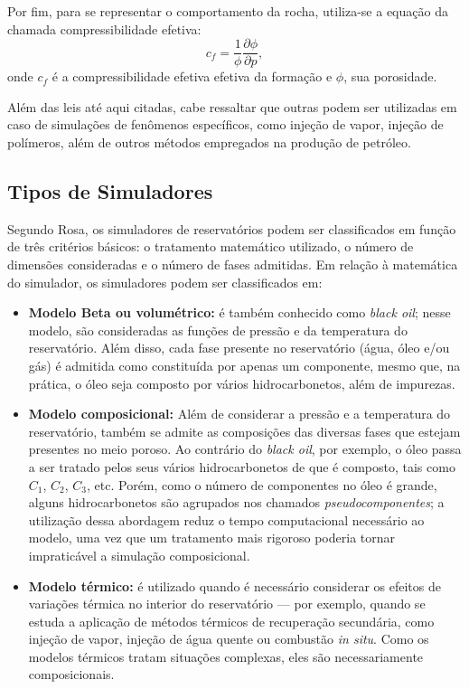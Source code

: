 Por fim, para se representar o comportamento da rocha, utiliza-se a equa\c{c}\~{a}o da chamada compressibilidade efetiva:
\begin{equation}
	c_f = \frac{1}{\phi} \frac{\partial\phi}{\partial p},
\end{equation}
onde $c_f$ \'{e} a compressibilidade efetiva efetiva da forma\c{c}\~{a}o e $\phi$, sua porosidade.

Al\'{e}m das leis at\'{e} aqui citadas, cabe ressaltar que outras podem ser utilizadas em caso de simula\c{c}\~{o}es de fen\^{o}menos espec\'{i}ficos, como inje\c{c}\~{a}o de vapor, inje\c{c}\~{a}o de pol\'{i}meros, al\'{e}m de outros m\'{e}todos empregados na produ\c{c}\~{a}o de petr\'{o}leo.

\subsection{Tipos de Simuladores}
Segundo Rosa, os simuladores de reservat\'{o}rios podem ser classificados em fun\c{c}\~{a}o de tr\^{e}s crit\'{e}rios b\'{a}sicos: o tratamento matem\'{a}tico utilizado, o n\'{u}mero de dimens\~{o}es consideradas e o n\'{u}mero de fases admitidas. Em rela\c{c}\~{a}o \`{a} matem\'{a}tica do simulador, os simuladores podem ser classificados em: 

\begin{itemize}
	\item \textbf{Modelo Beta ou volum\'{e}trico:} \'{e} tamb\'{e}m conhecido como \textit{black oil}; nesse modelo, s\~{a}o consideradas as fun\c{c}\~{o}es de press\~{a}o e da temperatura do reservat\'{o}rio. Al\'{e}m disso, cada fase presente no reservat\'{o}rio (\'{a}gua, \'{o}leo e/ou g\'{a}s) \'{e} admitida como constitu\'{i}da por apenas um componente, mesmo que, na pr\'{a}tica, o \'{o}leo seja composto por v\'{a}rios hidrocarbonetos, al\'{e}m de impurezas.
	\item \textbf{Modelo composicional:} Al\'{e}m de considerar a press\~{a}o e a temperatura do reservat\'{o}rio, tamb\'{e}m se admite as composi\c{c}\~{o}es das diversas fases que estejam presentes no meio poroso. Ao contr\'{a}rio do \textit{black oil}, por exemplo, o \'{o}leo passa a ser tratado pelos seus v\'{a}rios hidrocarbonetos de que \'{e} composto, tais como $C_1$, $C_2$, $C_3$, etc. Por\'{e}m, como o n\'{u}mero de componentes no \'{o}leo \'{e} grande, alguns hidrocarbonetos s\~{a}o agrupados nos chamados \textit{pseudocomponentes}; a utiliza\c{c}\~{a}o dessa abordagem reduz o tempo computacional necess\'{a}rio ao modelo, uma vez que um tratamento mais rigoroso poderia tornar impratic\'{a}vel a simula\c{c}\~{a}o composicional.
	\item \textbf{Modelo t\'{e}rmico:} \'{e} utilizado quando \'{e} necess\'{a}rio considerar os efeitos de varia\c{c}\~{o}es t\'{e}rmica no interior do reservat\'{o}rio --- por exemplo, quando se estuda a aplica\c{c}\~{a}o de m\'{e}todos t\'{e}rmicos de recupera\c{c}\~{a}o secund\'{a}ria, como inje\c{c}\~{a}o de vapor, inje\c{c}\~{a}o de \'{a}gua quente ou combust\~{a}o \textit{in situ}. Como os modelos t\'{e}rmicos tratam situa\c{c}\~{o}es complexas, eles s\~{a}o necessariamente composicionais.
\end{itemize}

